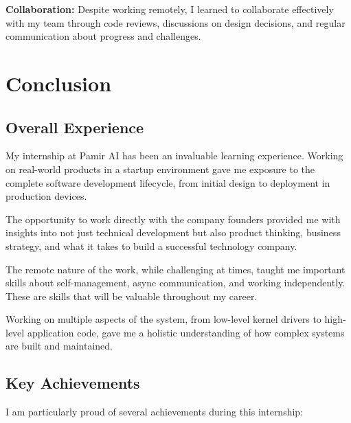 \documentclass[12pt,a4paper]{report}
\begin{document}
\vspace{0.3cm}

\textbf{Collaboration:} Despite working remotely, I learned to collaborate effectively with my team through code reviews, discussions on design decisions, and regular communication about progress and challenges.

\chapter{Conclusion}

\section{Overall Experience}

My internship at Pamir AI has been an invaluable learning experience. Working on real-world products in a startup environment gave me exposure to the complete software development lifecycle, from initial design to deployment in production devices.

\vspace{0.3cm}

The opportunity to work directly with the company founders provided me with insights into not just technical development but also product thinking, business strategy, and what it takes to build a successful technology company.

\vspace{0.3cm}

The remote nature of the work, while challenging at times, taught me important skills about self-management, async communication, and working independently. These are skills that will be valuable throughout my career.

\vspace{0.3cm}

Working on multiple aspects of the system, from low-level kernel drivers to high-level application code, gave me a holistic understanding of how complex systems are built and maintained.

\section{Key Achievements}

I am particularly proud of several achievements during this internship:
\end{document}
